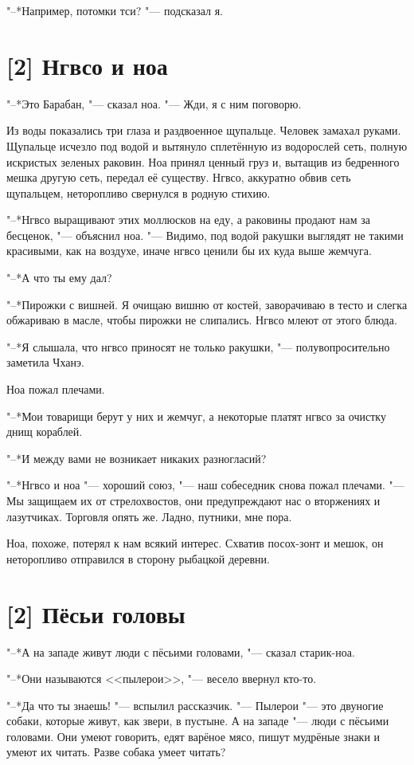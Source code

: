 "--*Например, потомки тси? "--- подсказал я.

\section{[2] Нгвсо и ноа}

"--*Это Барабан, "--- сказал ноа.
"--- Жди, я с ним поговорю.

Из воды показались три глаза и раздвоенное щупальце.
Человек замахал руками.
Щупальце исчезло под водой и вытянуло сплетённую из водорослей сеть, полную искристых зеленых раковин.
Ноа принял ценный груз и, вытащив из бедренного мешка другую сеть, передал её существу.
Нгвсо, аккуратно обвив сеть щупальцем, неторопливо свернулся в родную стихию.

"--*Нгвсо выращивают этих моллюсков на еду, а раковины продают нам за бесценок, "--- объяснил ноа.
"--- Видимо, под водой ракушки выглядят не такими красивыми, как на воздухе, иначе нгвсо ценили бы их куда выше жемчуга.

"--*А что ты ему дал?

"--*Пирожки с вишней.
Я очищаю вишню от костей, заворачиваю в тесто и слегка обжариваю в масле, чтобы пирожки не слипались.
Нгвсо млеют от этого блюда.

"--*Я слышала, что нгвсо приносят не только ракушки, "--- полувопросительно заметила Чханэ.

Ноа пожал плечами.

"--*Мои товарищи берут у них и жемчуг, а некоторые платят нгвсо за очистку днищ кораблей.

"--*И между вами не возникает никаких разногласий?

"--*Нгвсо и ноа "--- хороший союз, "--- наш собеседник снова пожал плечами.
"--- Мы защищаем их от стрелохвостов, они предупреждают нас о вторжениях и лазутчиках.
Торговля опять же.
Ладно, путники, мне пора.

Ноа, похоже, потерял к нам всякий интерес.
Схватив посох-зонт и мешок, он неторопливо отправился в сторону рыбацкой деревни.

\section{[2] Пёсьи головы}

"--*А на западе живут люди с пёсьими головами, "--- сказал старик-ноа.

"--*Они называются <<пылерои>>, "--- весело ввернул кто-то.

"--*Да что ты знаешь! "--- вспылил рассказчик.
"--- Пылерои "--- это двуногие собаки, которые живут, как звери, в пустыне.
А на западе "--- люди с пёсьими головами.
Они умеют говорить, едят варёное мясо, пишут мудрёные знаки и умеют их читать.
Разве собака умеет читать?

